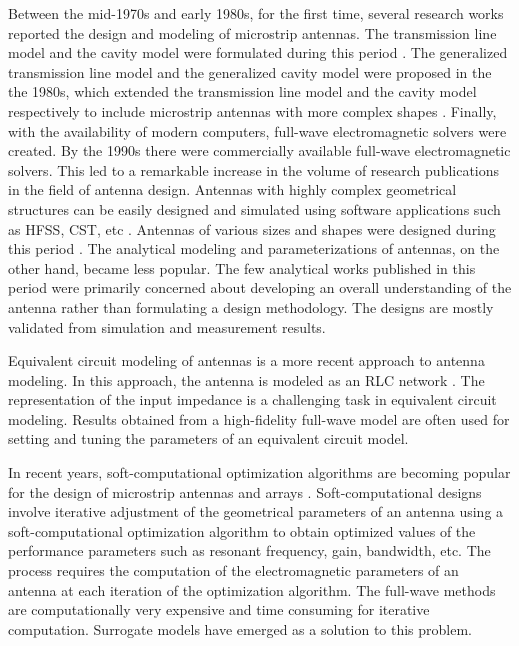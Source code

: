 Between the mid-1970s and early 1980s, for the first time, several research works reported the design and modeling of microstrip antennas. The transmission line model and the cavity model were formulated during this period \cite{handbook}. The generalized transmission line model and the generalized cavity model were proposed in the the 1980s, which extended the transmission line model and the cavity model respectively to include microstrip antennas with more complex shapes \cite{handbook}. Finally, with the availability of modern computers, full-wave electromagnetic solvers were created. By the 1990s there were commercially available full-wave electromagnetic solvers. This led to a remarkable increase in the volume of research publications in the field of antenna design. Antennas with highly complex geometrical structures can be easily designed and simulated using software applications such as HFSS{\circledR}, CST{\circledR}, etc \cite{practGuide3D}. Antennas of various sizes and shapes were designed during this period \cite{smallPatch0, BandSize0, HPatch1, uslot1, dualBandCircPol, dualBandWLAN, fractal1, slottedUWB, bandnotchCSRR1, bandnotchEBG1, SlottedPatchModel, spiralSlotGnd, GndSRRPatch}. The analytical modeling and parameterizations of antennas, on the other hand, became less popular. The few analytical works published in this period were primarily concerned about developing an overall understanding of the antenna rather than formulating a design methodology. The designs are mostly validated from simulation and measurement results.

Equivalent circuit modeling of antennas is a more recent approach to antenna modeling. In this approach, the antenna is modeled as an RLC network \cite{rectEqCkt, Broadband_EqCkt, UwbEqCktMethod, UwbPmaEqCkt1, UwbPmaEqCkt2, UwbPmaEqCkt3, UwbPmaEqCkt4, UwbNotchEqCkt}. The representation of the input impedance is a challenging task in equivalent circuit modeling. Results obtained from a high-fidelity full-wave model are often used for setting and tuning the parameters of an equivalent circuit model.

In recent years, soft-computational optimization algorithms are becoming popular for the design of microstrip antennas and arrays \cite{UwbPmaGaFdtd, cadNASA, compCAD4Arry, antSurrD01, surrMTM01, antSurrConstMO}. Soft-computational designs involve iterative adjustment of the geometrical parameters of an antenna using a soft-computational optimization algorithm to obtain optimized values of the performance parameters such as resonant frequency, gain, bandwidth, etc. The process requires the computation of the electromagnetic parameters of an antenna at each iteration of the optimization algorithm. The full-wave methods are computationally very expensive and time consuming for iterative computation. Surrogate models have emerged as a solution to this problem.

